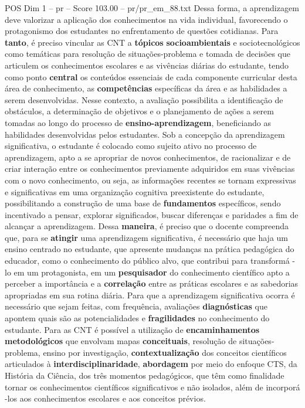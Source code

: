 \begin{textsample}{POS Dim 1 – pr – Score 103.00 – pr/pr\_em\_88.txt}
Dessa forma, a aprendizagem deve valorizar a aplicação dos conhecimentos na vida individual, favorecendo o protagonismo dos estudantes no enfrentamento de questões cotidianas.
Para \textbf{tanto}, é preciso vincular as CNT a \textbf{tópicos} \textbf{socioambientais} e sociotecnológicos como temáticas para resolução de situações-problema e tomada de decisões que articulem os conhecimentos escolares e as vivências diárias do estudante, tendo como ponto \textbf{central} os conteúdos essenciais de cada componente curricular desta área de conhecimento, as \textbf{competências} específicas da área e as habilidades a serem desenvolvidas.
Nesse contexto, a avaliação possibilita a identificação de obstáculos, a determinação de objetivos e o planejamento de ações a serem tomadas ao longo do processo de \textbf{ensino-aprendizagem}, beneficiando as habilidades desenvolvidas pelos estudantes.
Sob a concepção da aprendizagem significativa, o estudante é colocado como sujeito ativo no processo de aprendizagem, apto a se apropriar de novos conhecimentos, de racionalizar e de criar interação entre os conhecimentos previamente adquiridos em suas vivências com o novo conhecimento, ou seja, as informações recentes se tornam expressivas e significativas em uma organização cognitiva preexistente do estudante, possibilitando a construção de uma base de \textbf{fundamentos} específicos, sendo incentivado a pensar, explorar significados, buscar diferenças e paridades a fim de alcançar a aprendizagem.
Dessa \textbf{maneira}, é preciso que o docente compreenda que, para se \textbf{atingir} uma aprendizagem significativa, é necessário que haja um ensino centrado no estudante, que apresente mudanças na prática pedagógica do educador, como o conhecimento do público alvo, que contribui para transformá -lo em um protagonista, em um \textbf{pesquisador} do conhecimento científico apto a perceber a importância e a \textbf{correlação} entre as práticas escolares e as sabedorias apropriadas em sua rotina diária.
Para que a aprendizagem significativa ocorra é necessário que sejam feitas, com frequência, avaliações \textbf{diagnósticas} que apontem quais são as potencialidades e \textbf{fragilidades} no conhecimento do estudante.
Para as CNT é possível a utilização de \textbf{encaminhamentos} \textbf{metodológicos} que envolvam mapas \textbf{conceituais}, resolução de situações-problema, ensino por investigação, \textbf{contextualização} dos conceitos científicos articulados à \textbf{interdisciplinaridade}, \textbf{abordagem} por meio do enfoque CTS, da História da Ciência, dos três momentos pedagógicos, que têm como finalidade tornar os conhecimentos científicos significativos e não isolados, além de incorporá -los aos conhecimentos escolares e aos conceitos prévios.

\end{textsample}
